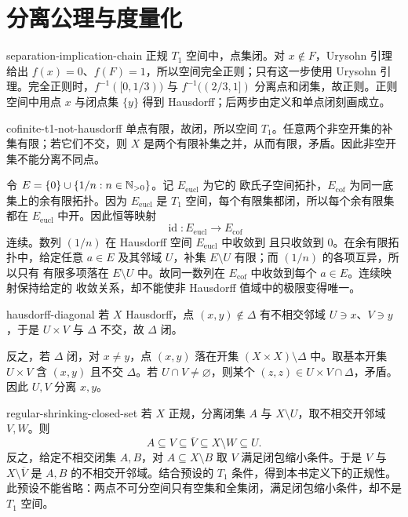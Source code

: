 \chapter{分离公理与度量化}
\label{chap:separation-metrization-solutions}

\begin{solution}{separation-implication-chain}
正规 \(T_1\) 空间中，点集闭。对 \(x\notin F\)，Urysohn 引理给出 \(f(x)=0\)、\(f(F)=1\)，所以空间完全正则；只有这一步使用 Urysohn 引理。完全正则时，\(f^{-1}([0,1/3))\) 与 \(f^{-1}((2/3,1])\) 分离点和闭集，故正则。正则空间中用点 \(x\) 与闭点集 \(\{y\}\) 得到 Hausdorff；后两步由定义和单点闭刻画成立。
\end{solution}

\begin{solution}{cofinite-t1-not-hausdorff}
单点有限，故闭，所以空间 \(T_1\)。任意两个非空开集的补集有限；若它们不交，则 \(X\) 是两个有限补集之并，从而有限，矛盾。因此非空开集不能分离不同点。

令 \(E=\{0\}\cup\{1/n:n\in\mathbb{N}_{>0}\}\)。记 \(E_{\mathrm{eucl}}\) 为它的
欧氏子空间拓扑，\(E_{\mathrm{cof}}\) 为同一底集上的余有限拓扑。因为
\(E_{\mathrm{eucl}}\) 是 \(T_1\) 空间，每个有限集都闭，所以每个余有限集
都在 \(E_{\mathrm{eucl}}\) 中开。因此恒等映射
\[
 \operatorname{id}:E_{\mathrm{eucl}}\longrightarrow E_{\mathrm{cof}}
\]
连续。数列 \((1/n)\) 在 Hausdorff 空间 \(E_{\mathrm{eucl}}\) 中收敛到
且只收敛到 \(0\)。在余有限拓扑中，给定任意 \(a\in E\) 及其邻域
\(U\)，补集 \(E\setminus U\) 有限；而 \((1/n)\) 的各项互异，所以只有
有限多项落在 \(E\setminus U\) 中。故同一数列在
\(E_{\mathrm{cof}}\) 中收敛到每个 \(a\in E\)。连续映射保持给定的
收敛关系，却不能使非 Hausdorff 值域中的极限变得唯一。
\end{solution}

\begin{solution}{hausdorff-diagonal}
若 \(X\) Hausdorff，点 \((x,y)\notin\Delta\) 有不相交邻域 \(U\ni x\)、\(V\ni y\)，于是 \(U\times V\) 与 \(\Delta\) 不交，故 \(\Delta\) 闭。

反之，若 \(\Delta\) 闭，对 \(x\ne y\)，点 \((x,y)\) 落在开集
\((X\times X)\setminus\Delta\) 中。取基本开集 \(U\times V\) 含 \((x,y)\) 且不交 \(\Delta\)。若 \(U\cap V\ne\varnothing\)，则某个 \((z,z)\in U\times V\cap\Delta\)，矛盾。因此 \(U,V\) 分离 \(x,y\)。
\end{solution}

\begin{solution}{regular-shrinking-closed-set}
若 \(X\) 正规，分离闭集 \(A\) 与 \(X\setminus U\)，取不相交开邻域 \(V,W\)。则
\[
 A\subseteq V\subseteq\overline V\subseteq X\setminus W\subseteq U.
\]
反之，给定不相交闭集 \(A,B\)，对 \(A\subseteq X\setminus B\) 取 \(V\) 满足闭包缩小条件。于是 \(V\) 与 \(X\setminus\overline V\) 是 \(A,B\) 的不相交开邻域。结合预设的 \(T_1\) 条件，得到本书定义下的正规性。此预设不能省略：两点不可分空间只有空集和全集闭，满足闭包缩小条件，却不是 \(T_1\) 空间。
\end{solution}

